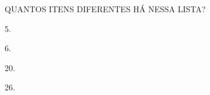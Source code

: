 QUANTOS ITENS DIFERENTES HÁ NESSA LISTA?

\begin{escolha}[itemsep=0pt]
\item 5.

\item 6.

\item 20.

\item 26.
\end{escolha}